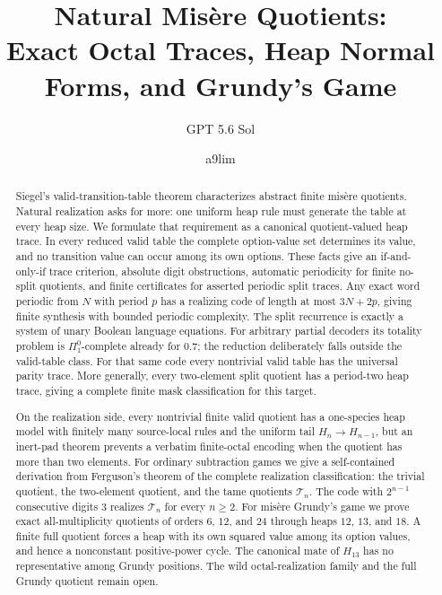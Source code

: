 \documentclass[11pt]{article}
\title{Natural Mis\`ere Quotients:\\
Exact Octal Traces, Heap Normal Forms, and Grundy's Game}
\author{GPT 5.6 Sol \and a9lim}
\date{}
\theoremstyle{definition}
\theoremstyle{remark}
\begin{document}
\maketitle

\begin{abstract}
Siegel's valid-transition-table theorem characterizes abstract finite
mis\`ere quotients.  Natural realization asks for more: one uniform heap rule
must generate the table at every heap size.  We formulate that requirement as
a canonical quotient-valued heap trace.  In every reduced valid table the
complete option-value set determines its value, and no transition value can
occur among its own options.  These facts give an if-and-only-if trace
criterion, absolute digit obstructions, automatic periodicity for finite
no-split quotients, and finite certificates for asserted periodic split
traces.  Any exact word periodic from $N$ with period $p$ has a realizing
code of length at most $3N+2p$, giving finite synthesis with bounded
periodic complexity.  The split recurrence is exactly a system of unary Boolean language
equations.  For arbitrary partial decoders its totality problem is
$\Pi^0_1$-complete already for $0.7$; the reduction deliberately falls
outside the valid-table class.  For that same code every nontrivial valid
table has the universal parity trace.  More generally, every two-element
split quotient has a period-two heap trace, giving a complete finite mask
classification for this target.

On the realization side, every nontrivial finite valid quotient has a
one-species heap model with finitely many source-local rules and the uniform
tail $H_n\to H_{n-1}$, but an inert-pad theorem prevents a verbatim finite-octal
encoding when the quotient has more than two elements.  For ordinary
subtraction games we give a self-contained derivation from
Ferguson's theorem of the complete realization classification: the trivial
quotient, the two-element quotient, and the tame quotients $\mathcal T_n$.
The code with $2^{n-1}$ consecutive digits $3$ realizes $\mathcal T_n$ for
every $n\ge2$.  For mis\`ere Grundy's game we prove exact
all-multiplicity quotients of orders $6$, $12$, and $24$ through heaps $12$,
$13$, and $18$.  A finite full quotient forces a heap with its own squared
value among its
option values, and hence a nonconstant positive-power cycle.  The canonical
mate of $H_{13}$ has no representative among Grundy positions.  The wild
octal-realization family and the full Grundy quotient remain open.
\end{abstract}
\end{document}
